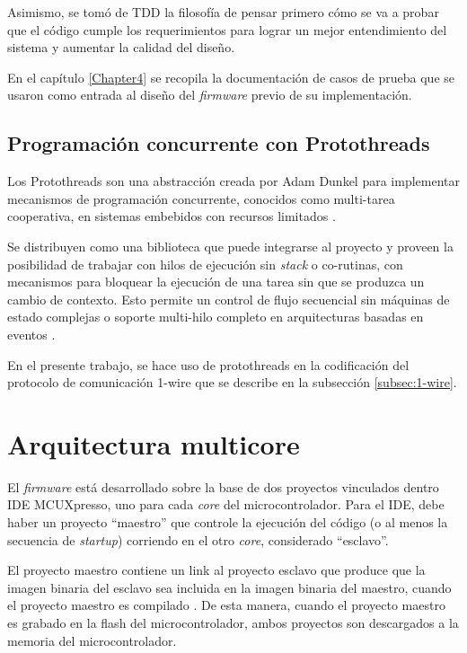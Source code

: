 Asimismo, se tomó de TDD la filosofía de pensar primero cómo se va a probar que el código cumple los requerimientos para lograr un mejor entendimiento del sistema y aumentar la calidad del diseño.

En el capítulo \ref{Chapter4} se recopila la documentación de casos de prueba que se usaron como entrada al diseño del \textit{firmware} previo de su implementación.

\subsection{Programación concurrente con Protothreads} 
\label{subsec:protothreads}

Los Protothreads son una abstracción creada por Adam Dunkel para implementar mecanismos de programación concurrente, conocidos como multi-tarea cooperativa, en sistemas embebidos con recursos limitados \citep{Protothreads}. 

Se distribuyen como una biblioteca que puede integrarse al proyecto y proveen la posibilidad de trabajar con hilos de ejecución sin \textit{stack} o co-rutinas, con mecanismos para bloquear la ejecución de una tarea sin que se produzca un cambio de contexto.  Esto permite un control de flujo secuencial sin máquinas de estado complejas o soporte multi-hilo completo en arquitecturas basadas en eventos \citep{dunkels06protothreads} \citep{dunkels05using}. 

En el presente trabajo, se hace uso de protothreads en la codificación del protocolo de comunicación 1-wire que se describe en la subsección \ref{subsec:1-wire}.


\section{Arquitectura multicore}
\label{sec:arquitectura}

El \textit{firmware} está desarrollado sobre la base de dos proyectos vinculados dentro IDE MCUXpresso, uno para cada \textit{core} del microcontrolador. Para el IDE, debe haber un proyecto ``maestro'' que controle la ejecución del código (o al menos la secuencia de \textit{startup}) corriendo en el otro \textit{core}, considerado ``esclavo''.  

El proyecto maestro contiene un link al proyecto esclavo que produce que la imagen binaria del esclavo sea incluida en la imagen  binaria del maestro, cuando el proyecto maestro es compilado \citep{nxp:mcuxpresso}. De esta manera, cuando el proyecto maestro es grabado en la flash del microcontrolador, ambos proyectos son descargados a la memoria del microcontrolador.


